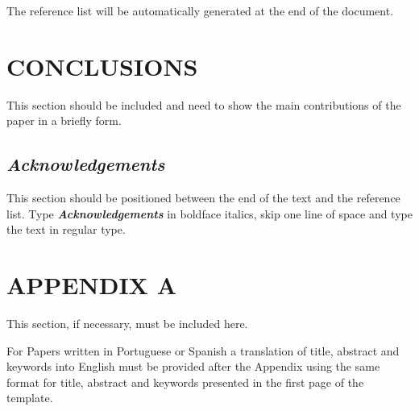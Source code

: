 \documentclass[12pt,fleqn]{article}
\begin{document}
The reference list will be automatically generated at the end of the document.

\section{CONCLUSIONS}
This section should be included and need to show the main contributions of the paper in a briefly form.

\subsection*{\textit{Acknowledgements}}
This section should be positioned between the end of the text and the reference list. Type \textbf{\textit{Acknowledgements}} in boldface italics, skip one line of space and type the text in regular type.


















\fontsize{11}{0}\selectfont


\vspace*{-0.1cm}

\section*{APPENDIX A}

This section, if necessary, must be included here.

\vspace{0.5cm}

For Papers written in Portuguese or Spanish a translation of title, abstract and keywords into English must be provided after the Appendix using the same format for title, abstract and keywords presented in the first page of the template.
\end{document}
